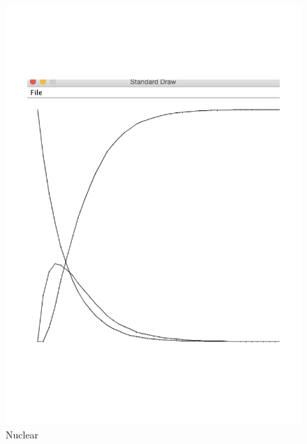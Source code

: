 \documentclass{article}
\begin{document}
\begin{figure}[h!]
\centering
\includegraphics{7.png}
\caption{Nuclear}
\label{fig:nuclear}
\end{figure}
\end{document}
